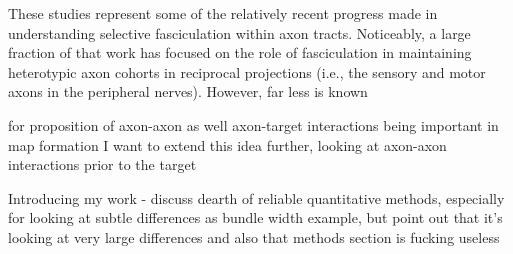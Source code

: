 These studies represent some of the relatively recent progress made in understanding selective fasciculation within axon tracts.
Noticeably, a large fraction of that work has focused on the role of fasciculation in maintaining heterotypic axon cohorts in reciprocal projections (i.e., the sensory and motor axons in the peripheral nerves).
However, far less is known 

\cite{weth2014chemoaffinity} for proposition of axon-axon as well axon-target interactions being important in map formation
I want to extend this idea further, looking at axon-axon interactions prior to the target

Introducing my work - discuss dearth of reliable quantitative methods, especially for looking at subtle differences
\cite{jaworski2012autocrine} as bundle width example, but point out that it's looking at very large differences and also that methods section is fucking useless